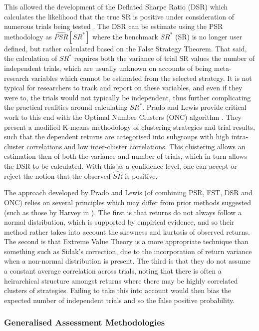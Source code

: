 \documentclass[a4paper,11pt,oneside]{article}
\theoremstyle{plain}
\theoremstyle{definition}
\begin{document}
	 This allowed the development of the Deflated Sharpe Ratio (DSR) which calculates the likelihood that the true SR is positive under consideration of numerous trials being tested \cite{BaileySharpe}. The DSR can be estimate using the PSR methodology as $\widehat{PSR}[SR^*]$ where the benchmark $SR^{*}$ (SR) is no longer user defined, but rather calculated based on the False Strategy Theorem. That said, the calculation of $SR^{*}$ requires both the variance of trial SR values the number of independent trials, which are usually unknown on accounts of being meta-research variables which cannot be estimated from the selected strategy. It is not typical for researchers to track and report on these variables, and even if they were to, the trials would not typically be independent, thus further complicating the practical realities around calculating $SR^{*}$. Prado and Lewis provide critical work to this end with the Optimal Number Clusters (ONC) algorithm \cite{PradoDSR}. They present a modified K-means methodology of clustering strategies and trial results, such that the dependent returns are categorised into subgroups with high intra-cluster correlations and low inter-cluster correlations. This clustering allows an estimation then of both the variance and number of trials, which in turn allows the DSR to be calculated. With this as a confidence level, one can accept or reject the notion that the observed $\widehat{SR}$ is positive.
		\hfill \break 
		
	The approach developed by Prado and Lewis (of combining PSR, FST, DSR and ONC) relies on several principles which may differ from prior methods suggested (such as those by Harvey in \cite{Harvey}). The first is that returns do not always follow a normal distribution, which is supported by empirical evidence, and so their method rather takes into account the skewness and kurtosis of observed returns. The second is that Extreme Value Theory is a more appropriate technique than something such as Sidak's correction, due to the incorporation of return variance when a non-normal distribution is present. The third is that they do not assume a  constant average correlation across trials, noting that there is often a heirarchical structure amongst returns where there may be highly correlated clusters of strategies. Failing to take this into account would then bias the expected number of independent trials and so the false positive probability. 
	
	\hfill \break
	
	\subsubsection{Generalised Assessment Methodologies}\label{lr_backtest_cscv}
	
\end{document}
